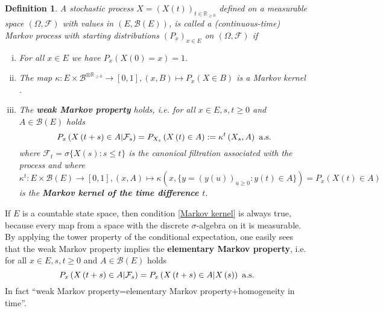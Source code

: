 \documentclass[12pt,a4paper]{scrartcl}
\newtheorem{definition}[theorem]{Definition}
\numberwithin{equation}{section}
\newcommand{\R}{\mathbb{R}} %
\begin{document}
\begin{definition}
A stochastic process $ X = \left(X\left(t\right)\right)_{t \in \R_{\geq 0}}$ defined on a measurable space $\left(\Omega,\mathcal{F} \right)$ with values in $\left(E, \mathcal{B}\left(E\right) \right)$, is called a (continuous-time) Markov process with starting distributions $\left(P_x\right)_{x \in E}$ on $\left(\Omega, \mathcal{F}\right)$ if 
\begin{enumerate} [(i)]
\item For all $x \in E$ we have $P_x\left(X\left(0\right) = x \right)=1.$
\item \label{Markov kernel} The map $\kappa: E \times \mathcal{B}^{\otimes \R_{\geq 0}} \to \left[0,1\right] , \left(x,B\right) \mapsto P_x\left(X \in B\right) $ is a Markov kernel \label{Markov kernel}.
\item The \textbf{weak Markov property} holds, i.e. for all $x \in E, s,t \geq 0$ and $ A \in \mathcal{B}\left(E\right)$ holds
\begin{equation} \label{eq:weakMarkovproperty}
P_x\left(X\left(t+s\right) \in A | \mathcal{F}_s \right) = P_{X_s}\left(X\left(t\right) \in A \right):= \kappa^t\left(X_s, A\right) \textnormal{ a.s.}
\end{equation}
where $\mathcal{F}_t = \sigma\lbrace X\left(s\right): s \leq t\rbrace  $ is the canonical filtration associated with the process and where $\kappa^t: E \times \mathcal{B}\left(E\right) \to \left[0,1\right], \left(x,A\right) \mapsto \kappa\left(x, \lbrace y=\left(y\left(u\right) \right)_{u \geq 0}: y\left(t\right) \in A\rbrace \right) = P_x\left(X\left(t\right) \in A \right)$ is the \textbf{ Markov kernel of the time difference  $t$}.
\end{enumerate}
\end{definition}

If $E$ is a countable state space, then condition \eqref{Markov kernel} is always true, because every map from a space with the discrete $\sigma$-algebra on it is measurable.\\
By applying the tower property of the conditional expectation, one easily sees that the weak Markov property implies the \textbf{elementary Markov property}, i.e. for all $x \in E, s,t \geq 0$ and $A \in \mathcal{B}\left(E\right)$ holds
\begin{equation}
P_x\left(X\left(t+s\right) \in A | \mathcal{F}_s \right) = P_x\left(X\left(t+s\right) \in A | X\left(s\right)\right) \textnormal{ a.s.}
\end{equation}
In fact “weak Markov property=elementary Markov property+homogeneity in time”.\\
\end{document}

